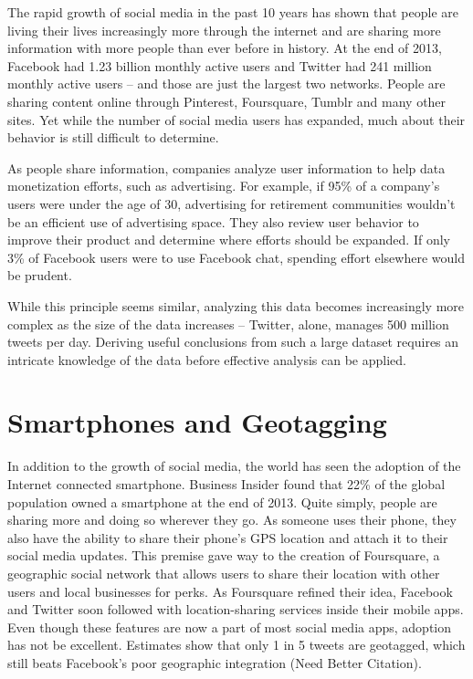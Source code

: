 \documentclass[midd]{thesis}
\begin{document}
The rapid growth of social media in the past 10 years has shown that people are living their lives increasingly more through the internet and are sharing more information with more people than ever before in history. At the end of 2013, Facebook had 1.23 billion monthly active users \cite{facebookabout} and Twitter had 241 million monthly active users \cite{twitterabout} -- and those are just the largest two networks. People are sharing content online through Pinterest, Foursquare, Tumblr and many other sites. Yet while the number of social media users has expanded, much about their behavior is still difficult to determine.

As people share information, companies analyze user information to help data monetization efforts, such as advertising. For example, if 95\% of a company’s users were under the age of 30, advertising for retirement communities wouldn't be an efficient use of advertising space. They also review user behavior to improve their product and determine where efforts should be expanded. If only 3\% of Facebook users were to use Facebook chat, spending effort elsewhere would be prudent. 

While this principle seems similar, analyzing this data becomes increasingly more complex as the size of the data increases -- Twitter, alone, manages 500 million tweets per day. Deriving useful conclusions from such a large dataset requires an intricate knowledge of the data before effective analysis can be applied.

\section{Smartphones and Geotagging}
In addition to the growth of social media, the world has seen the adoption of the Internet connected smartphone. Business Insider found that 22\% of the global population owned a smartphone at the end of 2013. Quite simply, people are sharing more and doing so wherever they go. As someone uses their phone, they also have the ability to share their phone's GPS location and attach it to their social media updates. This premise gave way to the creation of Foursquare, a geographic social network that allows users to share their location with other users and local businesses for perks. As Foursquare refined their idea, Facebook and Twitter soon followed with location-sharing services inside their mobile apps. Even though these features are now a part of most social media apps, adoption has not be excellent. Estimates show that only 1 in 5 tweets are geotagged, which still beats Facebook’s poor geographic integration (Need Better Citation).
\end{document}
